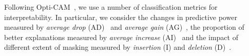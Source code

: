 Following Opti-CAM~\cite{zhang2023opti}, we use a number of classification metrics for interpretability. In particular, we consider the changes in predictive power measured by \emph{average drop} (AD)~\cite{DBLP:journals/corr/abs-1710-11063} and \emph{average gain} (AG)~\cite{zhang2023opti}, the proportion of better explanations measured by \emph{average increase} (AI)~\cite{DBLP:journals/corr/abs-1710-11063} and the impact of different extent of masking measured by \emph{insertion} (I) and \emph{deletion} (D)~\citep{petsiuk2018rise}.



